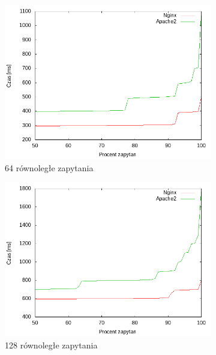 \begin{figure}
	\begin{subfigure}[h]{0.3\textwidth}
		\includegraphics[width=\textwidth]{testy/wybor_fib_15_64.png}
		\caption{64 równoległe zapytania}
	\end{subfigure}
	\begin{subfigure}[h]{0.3\textwidth}
		\includegraphics[width=\textwidth]{testy/wybor_fib_15_128.png}
		\caption{128 równoległe zapytania}
	\end{subfigure}
	\begin{subfigure}[h]{0.3\textwidth}

\end{subfigure}
\end{figure}
